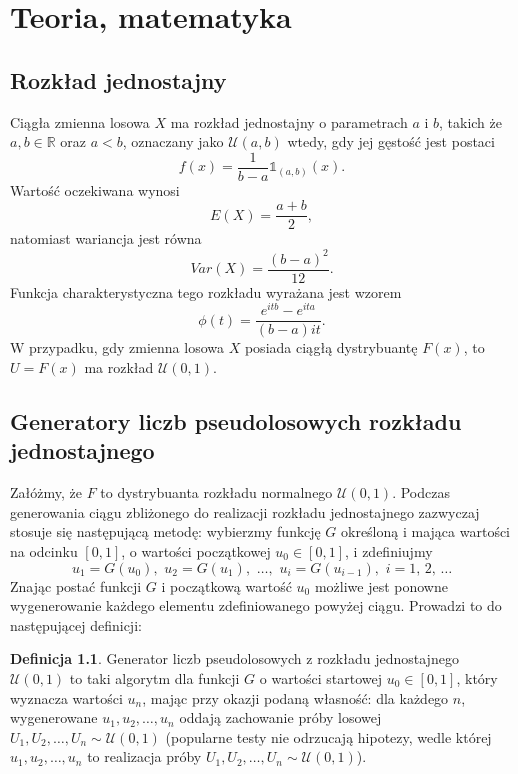 \documentclass[inzynierska]{pwr_wmat_praca_dyplomowa}
\theoremstyle{plain}
\numberwithin{theorem}{chapter}
\theoremstyle{definition}
\numberwithin{theorem}{chapter}
\newtheorem{definition}[theorem]{Definicja}
\begin{document}
\chapter{Teoria, matematyka}

\section{Rozkład jednostajny}
Ciągła zmienna losowa $X$ ma rozkład jednostajny o parametrach $a$ i $b$, takich że $a,b\in \mathds{R}$ oraz $a<b$, oznaczany jako $\mathcal{U}(a,b)$ wtedy, gdy jej gęstość jest postaci
\begin{equation}
f(x)=\frac{1}{b-a}\mathds{1}_{(a,b)}(x).
\end{equation}
Wartość oczekiwana wynosi
\begin{equation}
E(X)=\frac{a+b}{2},
\end{equation}
natomiast wariancja jest równa
\begin{equation}
Var(X)=\frac{(b-a)^2}{12}.
\end{equation} 
Funkcja charakterystyczna tego rozkładu wyrażana jest wzorem
\begin{equation}
\phi(t)=\frac{e^{itb}-e^{ita}}{(b-a)it}.
\end{equation}
W przypadku, gdy zmienna losowa $X$ posiada ciągłą dystrybuantę $F(x)$, to $U=F(x)$ ma rozkład $\mathcal{U}(0,1).$

\section{Generatory liczb pseudolosowych rozkładu jednostajnego} %
Załóżmy, że $F$ to dystrybuanta rozkładu normalnego $\mathcal{U}(0,1)$. Podczas generowania ciągu zbliżonego do realizacji rozkładu jednostajnego zazwyczaj stosuje się następującą metodę: wybierzmy funkcję $G$ określoną i mająca wartości na odcinku $[0,1]$, o wartości początkowej $u_0 \in [0,1]$, i zdefiniujmy
\begin{equation}
	u_1=G(u_0), \,\, u_2=G(u_1), \,\, \dots, \,\,u_i=G(u_{i-1}), \,\, i=1,\,2,\,\dots 
\end{equation}
Znając postać funkcji $G$ i początkową wartość $u_0$ możliwe jest ponowne wygenerowanie każdego elementu zdefiniowanego powyżej ciągu. Prowadzi to do następującej definicji:
\begin{definition}
	Generator liczb pseudolosowych z rozkładu jednostajnego $\mathcal{U}(0,1)$ to taki algorytm dla funkcji $G$ o wartości startowej $u_0 \in [0,1]$, który wyznacza wartości $u_n$, mając przy okazji podaną własność: dla każdego $n$, wygenerowane $u_1,u_2,\dots,u_n$ oddają zachowanie próby losowej $U_1,U_2,\dots,U_n \sim \mathcal{U}(0,1)$ (popularne testy nie odrzucają hipotezy, wedle której $u_1,u_2,\dots,u_n$ to realizacja próby $U_1,U_2,\dots,U_n \sim \mathcal{U}(0,1)$).
\end{definition}
\end{document}
